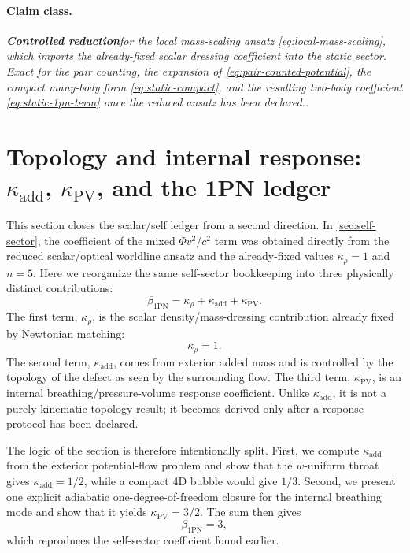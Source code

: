 \documentclass[11pt]{article}
\newcommand{\kadd}{\kappa_{\mathrm{add}}}
\newcommand{\kPV}{\kappa_{\mathrm{PV}}}
\newcommand{\krho}{\kappa_{\rho}}
\newcommand{\betaPN}{\beta_{\mathrm{1PN}}}
\newcommand{\PhiN}{\Phi}
\newcommand{\Controlled}{\textbf{Controlled reduction}}
\newcommand{\claimclass}[1]{\paragraph{Claim class.}\emph{#1.}}
\begin{document}
\claimclass{\Controlled for the local mass-scaling ansatz
\eqref{eq:local-mass-scaling}, which imports the already-fixed scalar dressing
coefficient into the static sector. Exact for the pair counting, the expansion of
\eqref{eq:pair-counted-potential}, the compact many-body form
\eqref{eq:static-compact}, and the resulting two-body coefficient
\eqref{eq:static-1pn-term} once the reduced ansatz has been declared.}


\section{Topology and internal response: \texorpdfstring{$\kadd$}{kappaadd}, \texorpdfstring{$\kPV$}{kappaPV}, and the 1PN ledger}
\label{sec:ledger}

This section closes the scalar/self ledger from a second direction. In
\cref{sec:self-sector}, the coefficient of the mixed \(\PhiN v^2/c^2\) term was obtained
directly from the reduced scalar/optical worldline ansatz and the already-fixed values
\(\krho=1\) and \(n=5\). Here we reorganize the same self-sector bookkeeping into three
physically distinct contributions:
\begin{equation}
\betaPN = \krho + \kadd + \kPV.
\label{eq:beta-ledger-def}
\end{equation}
The first term, \(\krho\), is the scalar density/mass-dressing contribution already fixed
by Newtonian matching:
\begin{equation}
\krho = 1.
\label{eq:krho-one-ledger}
\end{equation}
The second term, \(\kadd\), comes from exterior added mass and is controlled by the
topology of the defect as seen by the surrounding flow. The third term, \(\kPV\), is an
internal breathing/pressure-volume response coefficient. Unlike \(\kadd\), it is not a
purely kinematic topology result; it becomes derived only after a response protocol has
been declared.

The logic of the section is therefore intentionally split. First, we compute
\(\kadd\) from the exterior potential-flow problem and show that the
\(w\)-uniform throat gives \(\kadd=1/2\), while a compact 4D bubble would give
\(1/3\). Second, we present one explicit adiabatic one-degree-of-freedom closure for the
internal breathing mode and show that it yields \(\kPV=3/2\). The sum then gives
\begin{equation}
\betaPN = 3,
\end{equation}
which reproduces the self-sector coefficient found earlier.
\end{document}
